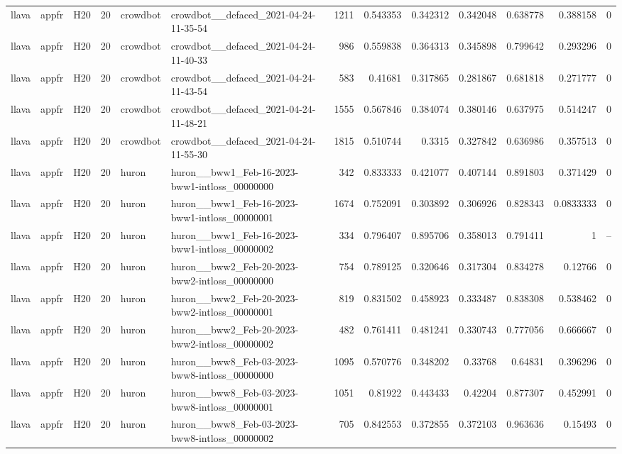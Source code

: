 \begin{longtable}{lllrllrrrrrrr}
llava & appfr & H20 & 20 & crowdbot & crowdbot\_\_defaced\_2021-04-24-11-35-54 & 1211 & 0.543353 & 0.342312 & 0.342048 & 0.638778 & 0.388158 & 0 \\
llava & appfr & H20 & 20 & crowdbot & crowdbot\_\_defaced\_2021-04-24-11-40-33 & 986 & 0.559838 & 0.364313 & 0.345898 & 0.799642 & 0.293296 & 0 \\
llava & appfr & H20 & 20 & crowdbot & crowdbot\_\_defaced\_2021-04-24-11-43-54 & 583 & 0.41681 & 0.317865 & 0.281867 & 0.681818 & 0.271777 & 0 \\
llava & appfr & H20 & 20 & crowdbot & crowdbot\_\_defaced\_2021-04-24-11-48-21 & 1555 & 0.567846 & 0.384074 & 0.380146 & 0.637975 & 0.514247 & 0 \\
llava & appfr & H20 & 20 & crowdbot & crowdbot\_\_defaced\_2021-04-24-11-55-30 & 1815 & 0.510744 & 0.3315 & 0.327842 & 0.636986 & 0.357513 & 0 \\
llava & appfr & H20 & 20 & huron & huron\_\_bww1\_Feb-16-2023-bww1-intloss\_00000000 & 342 & 0.833333 & 0.421077 & 0.407144 & 0.891803 & 0.371429 & 0 \\
llava & appfr & H20 & 20 & huron & huron\_\_bww1\_Feb-16-2023-bww1-intloss\_00000001 & 1674 & 0.752091 & 0.303892 & 0.306926 & 0.828343 & 0.0833333 & 0 \\
llava & appfr & H20 & 20 & huron & huron\_\_bww1\_Feb-16-2023-bww1-intloss\_00000002 & 334 & 0.796407 & 0.895706 & 0.358013 & 0.791411 & 1 & -- \\
llava & appfr & H20 & 20 & huron & huron\_\_bww2\_Feb-20-2023-bww2-intloss\_00000000 & 754 & 0.789125 & 0.320646 & 0.317304 & 0.834278 & 0.12766 & 0 \\
llava & appfr & H20 & 20 & huron & huron\_\_bww2\_Feb-20-2023-bww2-intloss\_00000001 & 819 & 0.831502 & 0.458923 & 0.333487 & 0.838308 & 0.538462 & 0 \\
llava & appfr & H20 & 20 & huron & huron\_\_bww2\_Feb-20-2023-bww2-intloss\_00000002 & 482 & 0.761411 & 0.481241 & 0.330743 & 0.777056 & 0.666667 & 0 \\
llava & appfr & H20 & 20 & huron & huron\_\_bww8\_Feb-03-2023-bww8-intloss\_00000000 & 1095 & 0.570776 & 0.348202 & 0.33768 & 0.64831 & 0.396296 & 0 \\
llava & appfr & H20 & 20 & huron & huron\_\_bww8\_Feb-03-2023-bww8-intloss\_00000001 & 1051 & 0.81922 & 0.443433 & 0.42204 & 0.877307 & 0.452991 & 0 \\
llava & appfr & H20 & 20 & huron & huron\_\_bww8\_Feb-03-2023-bww8-intloss\_00000002 & 705 & 0.842553 & 0.372855 & 0.372103 & 0.963636 & 0.15493 & 0 \\

\end{longtable}
